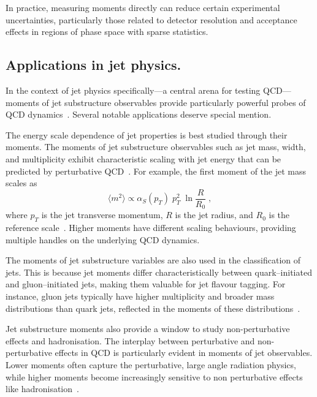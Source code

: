         In practice, measuring moments directly can reduce certain experimental uncertainties, particularly those related to detector resolution and acceptance effects in regions of phase space with sparse statistics.
        
    \subsection{Applications in jet physics.}
        In the context of jet physics specifically---a central arena for testing QCD---moments of jet substructure observables provide particularly powerful probes of QCD dynamics~\cite{CrispimRomao2024JetAnalysis, Dasgupta2013TowardsSubstructure}.
        Several notable applications deserve special mention.
        
        The energy scale dependence of jet properties is best studied through their moments. 
        The moments of jet substructure observables such as jet mass, width, and multiplicity exhibit characteristic scaling with jet energy that can be predicted by perturbative QCD~\cite{Dasgupta2013TowardsSubstructure}. For example, the first moment of the jet mass scales as
        \[
            \langle m^2 \rangle \propto \alpha_S(p_T) \;p_T^2 \;\ln\frac{R}{R_0}\;,
        \]
        where $p_T$ is the jet transverse momentum, $R$ is the jet radius, and $R_0$ is the reference scale~\cite{ManganoINTRODUCTIONQCD, Kodaira1978HowQCD}.
        Higher moments have different scaling behaviours, providing multiple handles on the underlying QCD dynamics.

        The moments of jet substructure variables are also used in the classification of jets.
        This is because jet moments differ characteristically between quark--initiated and gluon--initiated jets, making them valuable for jet flavour tagging.
        For instance, gluon jets typically have higher multiplicity and broader mass distributions than quark jets, reflected in the moments of these distributions~\cite{Butter2023PerformanceTagging, Ali2011JETSQCD, SalehMoghaddam2022ComparisonConstant}.
    
        Jet substructure moments also provide a window to study non-perturbative effects and hadronisation.
        The interplay between perturbative and non-perturbative effects in QCD is particularly evident in moments of jet observables.
        Lower moments often capture the perturbative, large angle radiation physics, while higher moments become increasingly sensitive to non perturbative effects like hadronisation~\cite{Dokshitzer1996DispersiveProcesses, Salam2001HadronShapes}.
    
